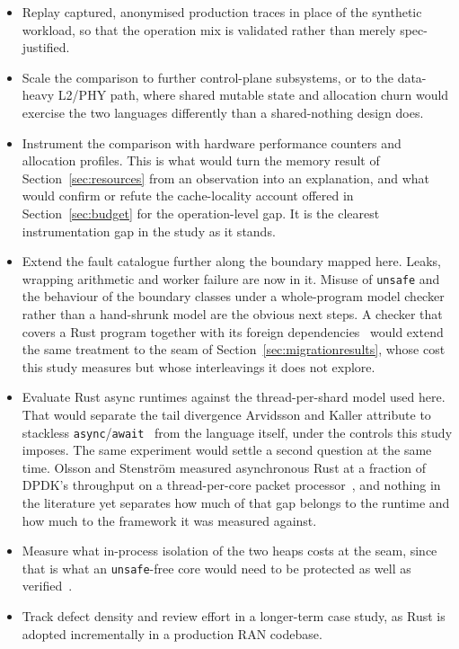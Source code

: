 \documentclass[english,oneside,a4paper,censored,csm,software-track-2020]{HYthesisML}
\begin{document}
\begin{itemize}
\item Replay captured, anonymised production traces in place of the synthetic workload, so that
  the operation mix is validated rather than merely spec-justified.
\item Scale the comparison to further control-plane subsystems, or to the data-heavy L2/PHY
  path, where shared mutable state and allocation churn would exercise the two languages
  differently than a shared-nothing design does.
\item Instrument the comparison with hardware performance counters and allocation profiles. This
  is what would turn the memory result of Section~\ref{sec:resources} from an observation into
  an explanation, and what would confirm or refute the cache-locality account offered in
  Section~\ref{sec:budget} for the operation-level gap. It is the clearest instrumentation gap
  in the study as it stands.
\item Extend the fault catalogue further along the boundary mapped here. Leaks, wrapping
  arithmetic and worker failure are now in it. Misuse of \texttt{unsafe} and the behaviour of
  the boundary classes under a whole-program model checker rather than a hand-shrunk model are
  the obvious next steps. A checker that covers a Rust program together with its foreign
  dependencies~\cite{pearce2026rustmc} would extend the same treatment to the seam of
  Section~\ref{sec:migrationresults}, whose cost this study measures but whose interleavings it
  does not explore.
\item Evaluate Rust async runtimes against the thread-per-shard model used here. That would
  separate the tail divergence Arvidsson and Kaller attribute to stackless
  \texttt{async}/\texttt{await}~\cite{arvidsson2025async} from the language itself, under the
  controls this study imposes. The same experiment would settle a second question at the same
  time. Olsson and Stenstr\"om measured asynchronous Rust at a fraction of DPDK's throughput on
  a thread-per-core packet processor~\cite{olsson2023asyncpackets}, and nothing in the literature
  yet separates how much of that gap belongs to the runtime and how much to the framework it was
  measured against.
\item Measure what in-process isolation of the two heaps costs at the seam, since that is what
  an \texttt{unsafe}-free core would need to be protected as well as
  verified~\cite{rivera2021galeed,kirth2022pkrusafe}.
\item Track defect density and review effort in a longer-term case study, as Rust is adopted
  incrementally in a production RAN codebase.
\end{itemize}
\end{document}
